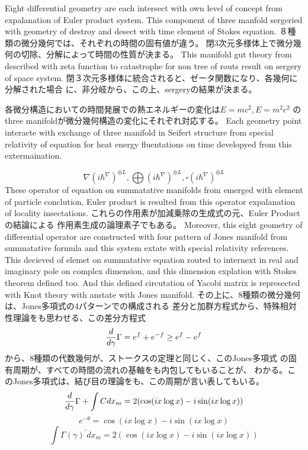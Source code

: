 \documentclass{jsarticle}
\begin{document}
{   Eight differential geometry are each intersect with own level of
   concept from expalanation of Euler product system.
   This component of three manfold sergeried with geometry of destroy and
   desect with time element of Stokes equation.
   ８種類の微分幾何では、それぞれの時間の固有値が違う。
   閉3次元多様体上で微分幾何の切除、分解によって時間の性質が決まる。
   This manifold gut theory from described with zeta function to
   catastrophe for non tree of routs result on sergery of space system.
   閉３次元多様体に統合されると、ゼータ関数になり、各幾何に分解された場合
   に、非分岐から、この上、sergeryの結果が決まる。

   各微分構造においての時間発展での熱エネルギーの変化は$E=mc^2, E=m^2 c^2 $
   のthree manifoldが微分幾何構造の変化にそれぞれ対応する。
   Each geometry point interacte with exchange of three manifold in
   Seifert structure from special relativity of equation for
   heat energy fluentations on time developyed from this extermaination.

   $$ \nabla ({i \hbar^{\nabla}})^{\oplus L}, \bigoplus ({i \hbar^{\nabla}})^{
	   \oplus L}, \square ({i \hbar^{\nabla}})^{\oplus L} $$
   These operator of equation on summatative manifolds from emerged with
   element of particle conclution, Euler product is resulted from this
   operator expalanation of locality insectations.
   これらの作用素が加減乗除の生成式の元、Euler Productの結論による
   作用素生成の論理素子でもある。
   Moreover, this eight geometry of differential operator are
   constructed with four pattern of Jones manifold from
   summatative formula and this system extate with special relativity
   references. This decieved of elemet on summatative equation routed
   to internext in real and imaginary pole on complex dimension,
   and this dimension explation with Stokes theorem defined too.
   And this defined circutation of Yacobi matrix is represected with
   Knot theory with anstate with Jones manifold.
   その上に、8種類の微分幾何は、Jones多項式の4パターンでの構成される
   差分と加群方程式から、特殊相対性理論をも思わせる、この差分方程式
   $$ {d \over d \gamma}\Gamma = e^{f} + e^{-f} \ge e^{f} - e^{f} $$
   から、8種類の代数幾何が、ストークスの定理と同じく、このJones多項式
   の固有周期が、すべての時間の流れの基軸をも内包してもいることが、
   わかる。このJones多項式は、結び目の理論をも、この周期が言い表してもいる。
   $$ {d \over d \gamma}\Gamma + \int C dx_m = 2(\cos(i x \log x) - i \sin
   (i x \log x)) $$
    $$ e^{- \theta} = \cos(i x \log x) - i \sin(i x \log x)$$
    $$ \int \Gamma(\gamma)^{'}dx_m = 2(\cos (i x \log x) 
    - i \sin(i x \log x)) $$

}
\end{document}

